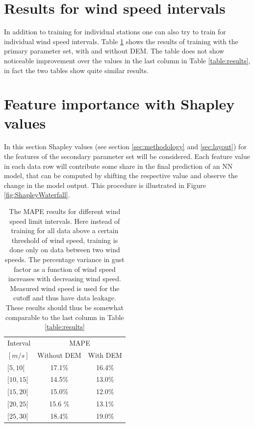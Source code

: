 \section{Results for wind speed intervals}
In addition to training for individual stations one can also try to train for individual wind speed intervals. Table \ref{table:closed_intervals} shows the results of training with the primary parameter set, with and without DEM. The table does not show noticeable improvement over the values in the last column in Table \ref{table:results}, in fact the two tables show quite similar results.

\section{Feature importance with Shapley values}\label{sec:shapley}
In this section Shapley values (see section \ref{sec:methodology} and \ref{sec:layout}) for the features of the secondary parameter set will be considered. Each feature value in each data row will contribute some share in the final prediction of an NN model, that can be computed by shifting the respective value and observe the change in the model output. This procedure is illustrated in Figure \ref{fig:ShapleyWaterfall}.

\begin{table}
    \caption[Model result looking at closed wind speed intervals]{The MAPE results for different wind speed limit intervals. Here instead of training for all data above a certain threshold of wind speed, training is done only on data between two wind speeds. The percentage variance in gust factor as a function of wind speed increases with decreasing wind speed. Measured wind speed is used for the cutoff and thus have data leakage. These results should thus be somewhat comparable to the last column in Table \ref{table:results}}
    \label{table:closed_intervals}
    \centering
    \begin{tabular}{lcc}
        \toprule
        Interval &  \multicolumn{2}{c}{MAPE}\\
        $[m/s]$ & Without DEM & With DEM \\
        \midrule
        $[5, 10[$ & 17.1\% & 16.4\%\\
        $[10, 15[$ & 14.5\% & 13.0\%\\
        $[15, 20[$ & 15.0\% & 12.0\%\\
        $[20, 25[$ & 15.6 \% & 13.1\%\\
        $[25, 30[$ & 18.4\% & 19.0\%\\
        \bottomrule
    \end{tabular}
\end{table}

